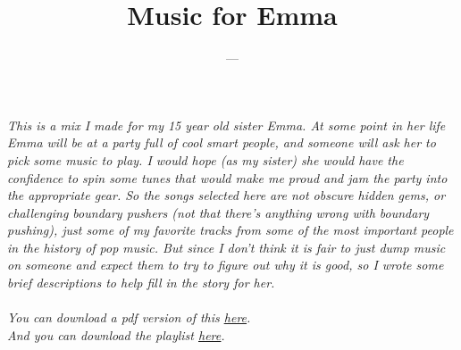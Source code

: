 \documentclass[letterpaper,single]{article}
\title{Music for Emma}
\date{}
\author{---}
\begin{document}
 
\maketitle
\large
\itshape
This is a mix I made for my 15 year old sister Emma.
At some point in her life Emma will be at a party full of cool smart people, and someone will ask her to pick some music to play. I would hope (as my sister) she would have the confidence to spin some tunes that would make me proud and jam the party into the appropriate gear.
So the songs selected here are not obscure hidden gems, or challenging boundary pushers (not that there's anything wrong with boundary pushing), just some of my favorite tracks from some of the most important people in the history of pop music.
But since I don't think it is fair to just dump music on someone and expect them to try to figure out why it is good, so I wrote some brief descriptions to help fill in the story for her.\\
\\
You can download a pdf version of this \href{http://dynohub.net/musicforemma/texfiles/MusicforEmma.pdf}{\underline{here}}.\\
And you can download the playlist \href{http://dynohub.net/musicforemma/musicforemma-tracks.zip}{\underline{here}}.\\
\upshape
\end{document}
